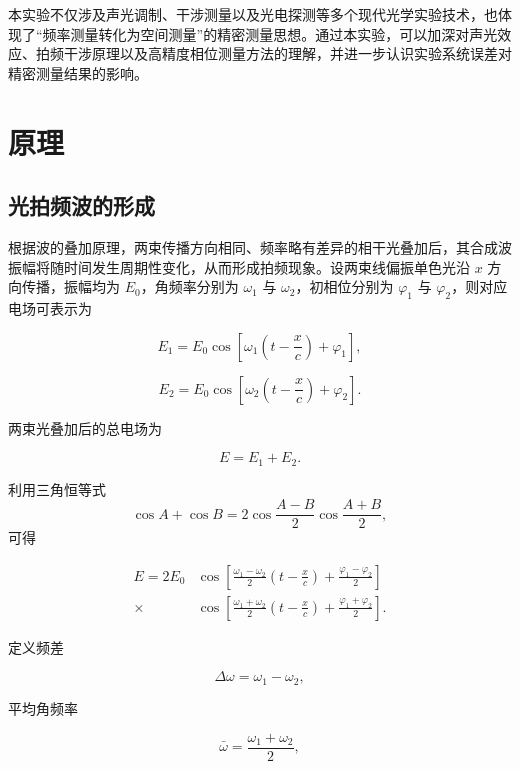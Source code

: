 \documentclass[a4paper]{ctexart}
\begin{document}
本实验不仅涉及声光调制、干涉测量以及光电探测等多个现代光学实验技术，也体现了“频率测量转化为空间测量”的精密测量思想。通过本实验，可以加深对声光效应、拍频干涉原理以及高精度相位测量方法的理解，并进一步认识实验系统误差对精密测量结果的影响。

    \section{原理}

\subsection{光拍频波的形成}

根据波的叠加原理，两束传播方向相同、频率略有差异的相干光叠加后，其合成波振幅将随时间发生周期性变化，从而形成拍频现象。设两束线偏振单色光沿 $x$ 方向传播，振幅均为 $E_0$，角频率分别为 $\omega_1$ 与 $\omega_2$，初相位分别为 $\varphi_1$ 与 $\varphi_2$，则对应电场可表示为

\begin{equation}
    E_1 = E_0 \cos \left[\omega_1 \left(t-\frac{x}{c}\right)+\varphi_1\right],
\end{equation}

\begin{equation}
    E_2 = E_0 \cos \left[\omega_2 \left(t-\frac{x}{c}\right)+\varphi_2\right].
\end{equation}

两束光叠加后的总电场为

\begin{equation}
    E = E_1 + E_2.
\end{equation}

利用三角恒等式
\[
\cos A+\cos B
=
2\cos\frac{A-B}{2}\cos\frac{A+B}{2},
\]
可得

\begin{align}
E
=
2E_0
&\cos\left[
\frac{\omega_1-\omega_2}{2}
\left(t-\frac{x}{c}\right)
+\frac{\varphi_1-\varphi_2}{2}
\right]
\nonumber\\
\times\,
&\cos\left[
\frac{\omega_1+\omega_2}{2}
\left(t-\frac{x}{c}\right)
+\frac{\varphi_1+\varphi_2}{2}
\right].
\end{align}

定义频差

\begin{equation}
    \Delta\omega=\omega_1-\omega_2,
\end{equation}

平均角频率

\begin{equation}
    \bar{\omega}=\frac{\omega_1+\omega_2}{2},
\end{equation}
\end{document}
